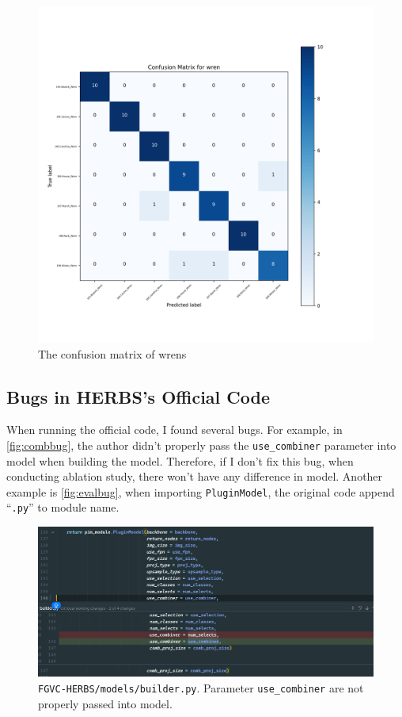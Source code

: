\documentclass[twocolumn]{extarticle}
\begin{document}
\begin{figure}[H]
\centering
\includegraphics[width=0.95\linewidth]{figure/eval_high_temp_wren}
\caption{The confusion matrix of wrens}
\label{fig:evalhightempwren}
\end{figure}

\subsection{Bugs in HERBS's Official Code}

When running the official code, I found several bugs. For example, in \autoref{fig:combbug}, the author didn't properly pass the \texttt{use\_combiner} parameter into model when building the model. Therefore, if I don't fix this bug, when conducting ablation study, there won't have any difference in model. Another example is \autoref{fig:evalbug}, when importing \texttt{PluginModel}, the original code append ``\texttt{.py}'' to module name.

\begin{figure}[H]
\centering
\includegraphics[width=0.95\linewidth]{figure/combbug}
\caption{\texttt{FGVC-HERBS/models/builder.py}. Parameter \texttt{use\_combiner} are not properly passed into model.}
\label{fig:combbug}
\end{figure}
\end{document}
